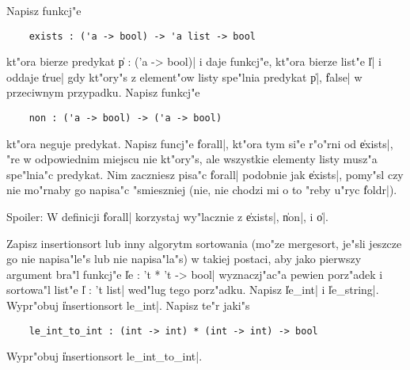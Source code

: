 \begin{exercises}
\item%
Napisz funkcj"e 
\begin{verbatim}
    exists : ('a -> bool) -> 'a list -> bool
\end{verbatim} 
kt"ora bierze predykat
\|p : ('a -> bool)| i daje funkcj"e, kt"ora bierze list"e \|l| i oddaje \|true|
gdy kt"ory"s z element"ow listy spe"lnia predykat \|p|, \|false| w przeciwnym przypadku.
Napisz funkcj"e 
\begin{verbatim}
    non : ('a -> bool) -> ('a -> bool)
\end{verbatim} 
kt"ora neguje predykat.
Napisz funcj"e \|forall|, kt"ora tym si"e r"o"rni od \|exists|, "re w odpowiednim
miejscu nie kt"ory"s, ale wszystkie elementy listy musz"a spe"lnia"c predykat.
Nim zaczniesz pisa"c \|forall| podobnie jak \|exists|, 
pomy"sl czy nie mo"rnaby go napisa"c "smieszniej 
(nie, nie chodzi mi o to "reby u"ryc \|foldr|).

Spoiler:
W definicji \|forall| korzystaj wy"lacznie z \|exists|, \|non|, i \|o|.

\item%
Zapisz insertionsort lub inny algorytm sortowania 
(mo"ze mergesort, je"sli jeszcze go nie napisa"le"s lub nie napisa"la"s) w takiej
postaci, aby jako pierwszy argument bra"l funkcj"e \|le : 't * 't -> bool| wyznaczj"ac"a
pewien porz"adek i sortowa"l list"e \|l : 't list| wed"lug tego porz"adku.
Napisz \|le_int| i \|le_string|. 
Wypr"obuj \|insertionsort le_int|.
Napisz te"r jaki"s 
\begin{verbatim}
    le_int_to_int : (int -> int) * (int -> int) -> bool
\end{verbatim}
Wypr"obuj \|insertionsort le_int_to_int|.

\end{exercises}


